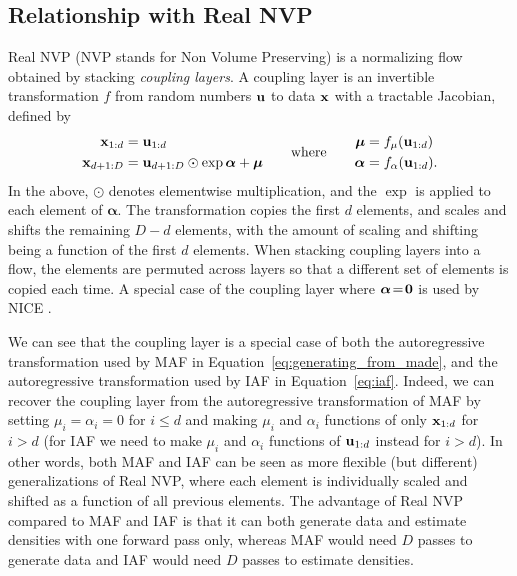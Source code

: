 \subsection{Relationship with Real NVP}

Real NVP \citep{Dinh:2017} (NVP stands for Non Volume Preserving) is a normalizing flow obtained by stacking \emph{coupling layers}. A coupling layer is an invertible transformation $f$ from random numbers $\mathbf{u}$ to data $\mathbf{x}$ with a tractable Jacobian, defined by
\begin{equation}
\begin{aligned}
\mathbf{x}_{1:d} &= \mathbf{u}_{1:d}\\
\mathbf{x}_{d+1:D} &= \mathbf{u}_{d+1:D}\odot\exp{\bm{\alpha}} + \bm{\mu}
\end{aligned}
\quad\quad\text{where}\quad\quad
\begin{aligned}
\bm{\mu} &= f_{\mu}\mathopen{}\left(\mathbf{u}_{1:d}\right)\mathclose{}\\
\bm{\alpha} &= f_{\alpha}\mathopen{}\left(\mathbf{u}_{1:d}\right)\mathclose{}.
\end{aligned}
\end{equation}
In the above, $\odot$ denotes elementwise multiplication, and the $\exp$ is applied to each element of $\bm{\alpha}$. The transformation copies the first $d$ elements, and scales and shifts the remaining $D\!-\!d$ elements, with the amount of scaling and shifting being a function of the first $d$ elements. When stacking coupling layers into a flow, the elements are permuted across layers so that a different set of elements is copied each time. A special case of the coupling layer where $\bm{\alpha} \!=\! \mathbf{0}$ is used by NICE \citep{Dinh:2014}.

We can see that the coupling layer is a special case of both the autoregressive transformation used by MAF in Equation~\eqref{eq:generating_from_made}, and the autoregressive transformation used by IAF in Equation~\eqref{eq:iaf}. Indeed, we can recover the coupling layer from the autoregressive transformation of MAF by setting $\mu_i = \alpha_i = 0$ for $i\le d$ and making $\mu_i$ and $\alpha_i$ functions of only $\mathbf{x}_{1:d}$ for $i>d$ (for IAF we need to make $\mu_i$ and $\alpha_i$ functions of $\mathbf{u}_{1:d}$ instead for $i>d$). In other words, both MAF and IAF can be seen as more flexible (but different) generalizations of Real NVP, where each element is individually scaled and shifted as a function of all previous elements. The advantage of Real NVP compared to MAF and IAF is that it can both generate data and estimate densities with one forward pass only, whereas MAF would need $D$ passes to generate data and IAF would need $D$ passes to estimate densities.


